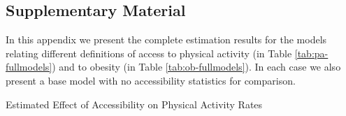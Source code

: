 \documentclass[Crown,sageh.bst]{sagej}
\begin{document}




\hypertarget{appendix}{%
\subsection{Supplementary Material}\label{appendix}}
\setcounter{table}{0}
\renewcommand{\thetable}{S\arabic{table}}

In this appendix we present the complete estimation results for the
models relating different definitions of access to physical activity (in
Table \ref{tab:pa-fullmodels}) and to obesity (in Table
\ref{tab:ob-fullmodels}). In each case we also present a base model with
no accessibility statistics for comparison.

\begin{table*}
  \caption{\label{tab:pa-fullmodels} Estimated Effect of Accessibility on Physical Activity Rates}
  \begin{center}
  \scalebox{0.8}{

}
\end{center}
\end{table*}
\end{document}
